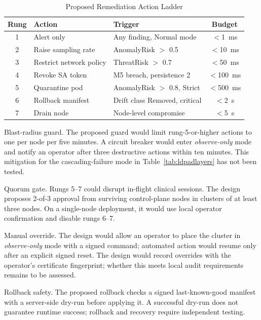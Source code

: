 \documentclass{ieeeaccess}
\renewcommand{\textbf}[1]{#1}
\begin{document}
\begin{table}[ht]
\caption{Proposed Remediation Action Ladder}
\label{tab:ladder}
\centering
\setlength{\tabcolsep}{3pt}
\begin{tabular}{|c|p{50pt}|p{48pt}|c|}
\hline
\textbf{Rung} & \textbf{Action} & \textbf{Trigger} & \textbf{Budget} \\
\hline
1 & Alert only & Any finding, Normal mode & $<$1~ms \\
\hline
2 & Raise sampling rate & AnomalyRisk $>$ 0.5 & $<$10~ms \\
\hline
3 & Restrict network policy & ThreatRisk $>$ 0.7 & $<$50~ms \\
\hline
4 & Revoke SA token & M5 breach, persistence 2 & $<$100~ms \\
\hline
5 & Quarantine pod & AnomalyRisk $>$ 0.8, Strict & $<$500~ms \\
\hline
6 & Rollback manifest & Drift class Removed, critical & $<$2~s \\
\hline
7 & Drain node & Node-level compromise & $<$5~s \\
\hline
\end{tabular}
\end{table}

\noindent\textbf{Blast-radius guard.} The proposed guard would limit rung-5-or-higher actions to one per node per five minutes. A circuit breaker would enter \emph{observe-only} mode and notify an operator after three destructive actions within ten minutes. This mitigation for the cascading-failure mode in Table~\ref{tab:ldpadlayers} has not been tested.

\noindent\textbf{Quorum gate.} Rungs 5--7 could disrupt in-flight clinical sessions. The design proposes 2-of-3 approval from surviving control-plane nodes in clusters of at least three nodes. On a single-node deployment, it would use local operator confirmation and disable rungs 6--7.

\noindent\textbf{Manual override.} The design would allow an operator to place the cluster in \emph{observe-only} mode with a signed command; automated action would resume only after an explicit signed reset. The design would record overrides with the operator's certificate fingerprint; whether this meets local audit requirements remains to be assessed.

\noindent\textbf{Rollback safety.} The proposed rollback checks a signed last-known-good manifest with a server-side dry-run before applying it. A successful dry-run does not guarantee runtime success; rollback and recovery require independent testing.
\end{document}
